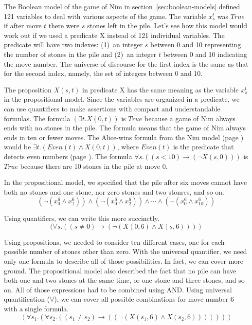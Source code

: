 {{The Boolean model of the game of Nim in section~\ref{sec:boolean-models}
defined 121 variables to deal with various aspects of the game.
The variable $x_s^t$
was $True$ if after move $t$ there were $s$ stones left in the pile.
Let's see how this model would work out if we used a predicate X
instead of 121 individual variables.
The predicate will have two indexes: (1)~an integer $s$ between 0 and 10
representing the number of stones in the pile
and (2)~an integer $t$ between 0 and 10 indicating the move number.
The universe of discourse for the first index is the same as that
for the second index, namely, the set of integers between 0 and 10.

The proposition $X(s,t)$ in predicate X has the same meaning as the variable
$x_s^t$ in the propositional model.
Since the variables are organized in a predicate,
we can use quantifiers to make assertions with compact and understandable formulas.
The formula  $(\exists t.X(0,t))$
is $True$ because a game of Nim always ends with no
stones in the pile.
The formula means that the game of Nim always ends in ten or fewer moves.
The Alice-wins formula
from the Nim model (page \pageref{alice-wins-formula})
would be $\exists t.(Even(t) \wedge X(0,t))$,
where
$Even(t)$ is the predicate that detects even numbers
(page \pageref{even-number-predicate-Even}).
The formula $\forall s.((s < 10) \rightarrow (\neg X(s,0)))$
is $True$ because there are 10 stones in the pile at move 0.

In the propositional model, we specified that the pile after six moves
cannot have both no stones and one stone, nor zero stones and two stonres, and so on.
$$(\neg(x_{0}^{6} \wedge x_{1}^{6})) \wedge (\neg(x_{0}^{6} \wedge x_{2}^{6})) \wedge \cdots \wedge (\neg(x_{0}^{6} \wedge x_{10}^{6}))$$

Using quantifiers, we can write this more succinctly.
$$(\forall s.((s \neq 0) \rightarrow (\neg(X(0, 6) \wedge X(s, 6))))$$

Using propositions, we needed to consider ten
different cases, one for each possible number of stones other than zero. With the
universal quantifier, we need only one formula to describe all of those
possibilities. In fact, we can cover more ground.
The propositional model also described the fact
that no pile can have both one and two stones at the same time, or one stone and three
stones, and so on.  All of those expressions had to be combined using AND.
Using universal quantification ($\forall$),
we can cover all possible combinations
for move number 6 with a single formula.
$$(\forall s_1.(\forall s_2.((s_1 \ne s_2 ) \rightarrow ((\neg(X(s_1, 6) \wedge X(s_2, 6)))))))$$

}}

